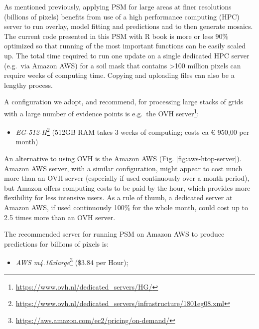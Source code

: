 \documentclass[graybox,natbib,nospthms,UStrade]{svmono}
\providecommand{\tightlist}{%
  \setlength{\itemsep}{0pt}\setlength{\parskip}{0pt}}
\providecommand{\tightlist}{\setlength{\itemsep}{0pt}\setlength{\parskip}{0pt}}
\renewcommand{\href}[2]{#2 (\url{#1})}
\renewcommand{\href}[2]{#2\footnote{\url{#1}}}
\begin{document}
As mentioned previously, applying PSM for large areas at finer
resolutions (billions of pixels) benefits from use of a high performance
computing (HPC) server to run overlay, model fitting and predictions and
to then generate mosaics. The current code presented in this PSM with R
book is more or less 90\% optimized so that running of the most important
functions can be easily scaled up. The total time required to run one
update on a single dedicated HPC server (e.g.~via Amazon AWS) for a
soil mask that contains \textgreater{}100 million pixels can
require weeks of computing time. Copying and uploading files can also be
a lengthy process.

A configuration we adopt, and recommend, for processing large stacks of
grids with a large number of evidence points is e.g.~the \href{https://www.ovh.nl/dedicated_servers/HG/}{OVH server}:

\begin{itemize}
\tightlist
\item
  \href{https://www.ovh.nl/dedicated_servers/infrastructure/1801eg08.xml}{\emph{EG-512-H}}
  (512GB RAM takes 3 weeks of computing; costs ca € 950,00
  per month)
\end{itemize}

An alternative to using OVH is the Amazon AWS (Fig. \ref{fig:aws-htop-server}).
Amazon AWS server, with a similar configuration, might appear to cost much more than an OVH server
(especially if used continuously over a month period), but Amazon offers
computing costs to be paid by the hour, which provides more flexibility
for less intensive users. As a rule of thumb, a dedicated server at
Amazon AWS, if used continuously 100\% for the whole month, could cost
up to 2.5 times more than an OVH server.

The recommended server for running PSM on Amazon AWS to produce predictions for billions of pixels is:

\begin{itemize}
\tightlist
\item
  \href{https://aws.amazon.com/ec2/pricing/on-demand/}{\emph{AWS m4.16xlarge}}
  (\$3.84 per Hour);
\end{itemize}
\end{document}
